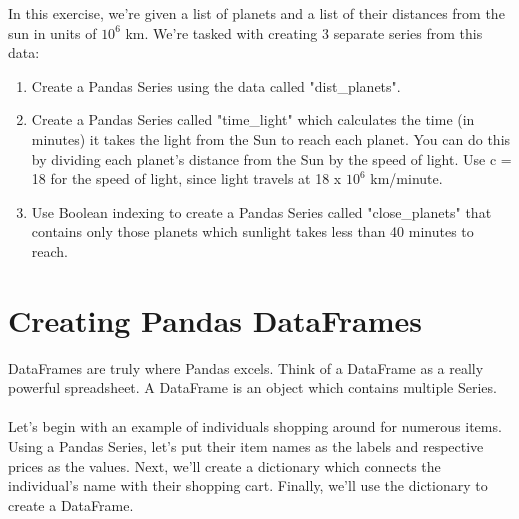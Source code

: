 \documentclass{article}
\begin{document}
In this exercise, we're given a list of planets and a list of their distances from the sun in units of $10^6$ km. We're tasked with creating 3 separate series from this data:
\begin{enumerate}
	\item Create a Pandas Series using the data called "dist\_planets".
	\item Create a Pandas Series called "time\_light" which calculates the time (in minutes) it takes the light from the Sun to reach each planet. You can do this by dividing each planet's distance from the Sun by the speed of light. Use c = 18 for the speed of light, since light travels at 18 x $10^6$ km/minute.
	\item Use Boolean indexing to create a Pandas Series called "close\_planets" that contains only those planets which sunlight takes less than 40 minutes to reach.
\end{enumerate}



\section{Creating Pandas DataFrames}\label{sec:concept4}
DataFrames are truly where Pandas excels. Think of a DataFrame as a really powerful spreadsheet. A DataFrame is an object which contains multiple Series.
\\\\
Let's begin with an example of individuals shopping around for numerous items. Using a Pandas Series, let's put their item names as the labels and respective prices as the values. Next, we'll create a dictionary which connects the individual's name with their shopping cart. Finally, we'll use the dictionary to create a DataFrame.
\end{document}
